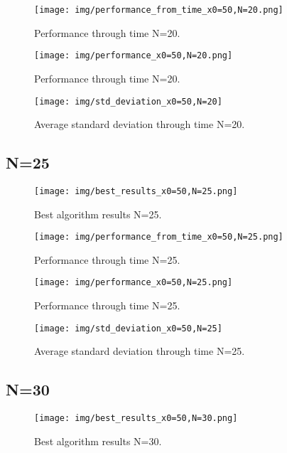 \documentclass{article}
\begin{document}
\begin{figure}[H]
\centering
\texttt{[image: img/performance\_from\_time\_x0=50,N=20.png]}
\caption{Performance through time N=20.}
\label{fig:label1}
\end{figure}

\begin{figure}[H]
\centering
\texttt{[image: img/performance\_x0=50,N=20.png]}
\caption{Performance through time N=20.}
\label{fig:label1}
\end{figure}

\begin{figure}[H]
\centering
\texttt{[image: img/std\_deviation\_x0=50,N=20]}
\caption{Average standard deviation through time N=20.}
\label{fig:label1}
\end{figure}


\subsection{N=25}
\begin{figure}[H]
\centering
\texttt{[image: img/best\_results\_x0=50,N=25.png]}
\caption{Best algorithm results N=25.}
\label{fig:label1}
\end{figure}

\begin{figure}[H]
\centering
\texttt{[image: img/performance\_from\_time\_x0=50,N=25.png]}
\caption{Performance through time N=25.}
\label{fig:label1}
\end{figure}

\begin{figure}[H]
\centering
\texttt{[image: img/performance\_x0=50,N=25.png]}
\caption{Performance through time N=25.}
\label{fig:label1}
\end{figure}

\begin{figure}[H]
\centering
\texttt{[image: img/std\_deviation\_x0=50,N=25]}
\caption{Average standard deviation through time N=25.}
\label{fig:label1}
\end{figure}


\subsection{N=30}
\begin{figure}[H]
\centering
\texttt{[image: img/best\_results\_x0=50,N=30.png]}
\caption{Best algorithm results N=30.}
\label{fig:label1}
\end{figure}
\end{document}
